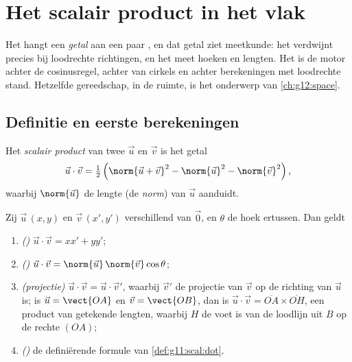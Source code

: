 \chapter{Het scalair product in het vlak}\label{ch:g11:scal}

Het  hangt een \emph{getal} aan een paar , en dat getal
ziet meetkunde: het verdwijnt precies bij loodrechte richtingen, en het meet
hoeken en lengten. Het is de motor achter de cosinusregel, achter
 van cirkels en achter berekeningen met loodrechte stand.
Hetzelfde gereedschap, in de ruimte, is het onderwerp van \cref{ch:g12:space}.

\section{Definitie en eerste berekeningen}

\begin{definition}\label{def:g11:scal:dot}
Het \emph{scalair product} van twee  $\vec u$
en $\vec v$ is het getal
\[
\vec u \cdot \vec v
= \tfrac12\left(\norm{\vec u + \vec v}^2 - \norm{\vec u}^2
- \norm{\vec v}^2\right),
\]
waarbij $\norm{\vec u}$ de lengte (de \emph{norm}) van $\vec u$
aanduidt.
\end{definition}

\begin{theorem}\label{thm:g11:scal:faces}
Zij $\vec u\,(x, y)$ en $\vec v\,(x', y')$  verschillend van
$\vec 0$, en $\theta$ de hoek ertussen. Dan geldt
\begin{enumerate}
  \item \emph{()} $\vec u \cdot \vec v = xx' + yy'$;
  \item \emph{()} $\vec u \cdot \vec v =
        \norm{\vec u}\,\norm{\vec v}\cos\theta$;
  \item \emph{(projectie)} $\vec u \cdot \vec v = \vec u \cdot \vec v'$,
        waarbij $\vec v'$ de  projectie van $\vec v$ op de
        richting van $\vec u$ is; is $\vec u = \vect{OA}$ en
        $\vec v = \vect{OB}$, dan is
        $\vec u \cdot \vec v = \overline{OA} \times \overline{OH}$, een
        product van getekende lengten, waarbij $H$ de voet is van de
        loodlijn uit $B$ op de rechte $(OA)$;
  \item \emph{()} de definiërende formule van \cref{def:g11:scal:dot}.
\end{enumerate}
\end{theorem}

